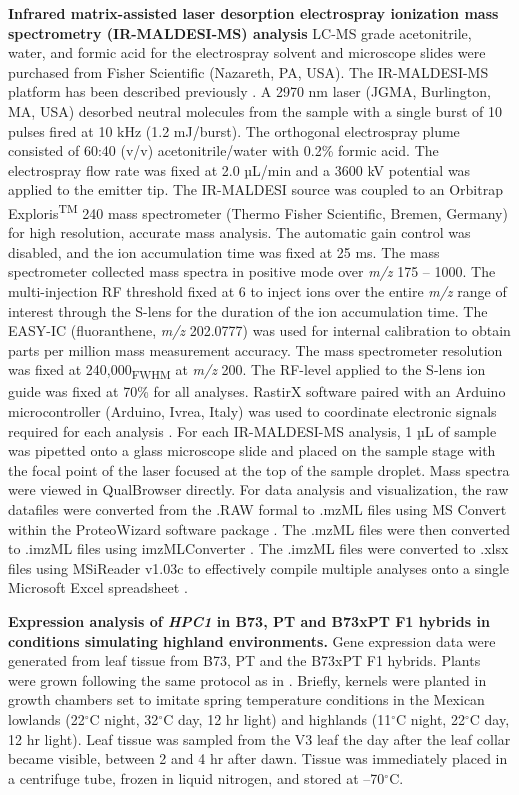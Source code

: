 \documentclass[9pt,twocolumn,twoside,lineno]{biorxiv}
\newcommand{\hpc}{\textit{HPC1}\xspace}
\begin{document}
\textbf{Infrared matrix-assisted laser desorption electrospray ionization mass spectrometry (IR-MALDESI-MS) analysis}
LC-MS grade acetonitrile, water, and formic acid for the electrospray solvent and microscope slides were purchased from Fisher Scientific (Nazareth, PA, USA). 
The IR-MALDESI-MS platform has been described previously \cite{Caleb_Bagley2021-eh, Bokhart2016-he}. 
A 2970 nm laser (JGMA, Burlington, MA, USA) desorbed neutral molecules from the sample with a single burst of 10 pulses fired at 10 kHz (1.2 mJ/burst). 
The orthogonal electrospray plume consisted of 60:40 (v/v) acetonitrile/water with 0.2\% formic acid. 
The electrospray flow rate was fixed at 2.0 µL/min and a 3600 kV potential was applied to the emitter tip. 
 The IR-MALDESI source was coupled to an Orbitrap Exploris\textsuperscript{TM} 240 mass spectrometer (Thermo Fisher Scientific, Bremen, Germany) for high resolution, accurate mass analysis. 
The automatic gain control was disabled, and the ion accumulation time was fixed at 25 ms. 
The mass spectrometer collected mass spectra in positive mode over \textit{m/z} 175 – 1000. 
The multi-injection RF threshold fixed at 6 to inject ions over the entire \textit{m/z} range of interest through the S-lens for the duration of the ion accumulation time. 
The EASY-IC (fluoranthene, \textit{m/z} 202.0777) was used for internal calibration to obtain parts per million mass measurement accuracy. 
The mass spectrometer resolution was fixed at 240,000\textsubscript{FWHM} at \textit{m/z} 200. The RF-level applied to the S-lens ion guide was fixed at 70\% for all analyses. 
RastirX software paired with an Arduino microcontroller (Arduino, Ivrea, Italy) was used to coordinate electronic signals required for each analysis \cite{Garrard2020-nt}. 
For each IR-MALDESI-MS analysis, 1 µL of sample was pipetted onto a glass microscope slide and placed on the sample stage with the focal point of the laser focused at the top of the sample droplet.
Mass spectra were viewed in QualBrowser directly. 
For data analysis and visualization, the raw datafiles were converted from the .RAW formal to .mzML files using MS Convert within the ProteoWizard software package \cite{Chambers2012-da}. 
The .mzML files were then converted to .imzML files using imzMLConverter \cite{Race2012-wl}. 
The .imzML files were converted to .xlsx files using MSiReader v1.03c to effectively compile multiple analyses onto a single Microsoft Excel spreadsheet \cite{Robichaud2013-ao, Bokhart2018-hs}.

\textbf{Expression analysis of \hpc in B73, PT and B73xPT F1 hybrids in conditions simulating highland environments.}
Gene expression data were generated from leaf tissue from B73, PT and the B73xPT F1 hybrids. 
Plants were grown following the same protocol as in \cite{Crow2020-gene}.
Briefly, kernels were planted in growth chambers set to imitate spring temperature conditions in the Mexican lowlands (22$^{\circ}$C night, 32$^{\circ}$C day, 12 hr light) and highlands (11$^{\circ}$C night, 22$^{\circ}$C day, 12 hr light). 
Leaf tissue was sampled from the V3 leaf the day after the leaf collar became visible, between 2 and 4 hr after dawn. 
Tissue was immediately placed in a centrifuge tube, frozen in liquid nitrogen, and stored at --70$^{\circ}$C.
\end{document}
